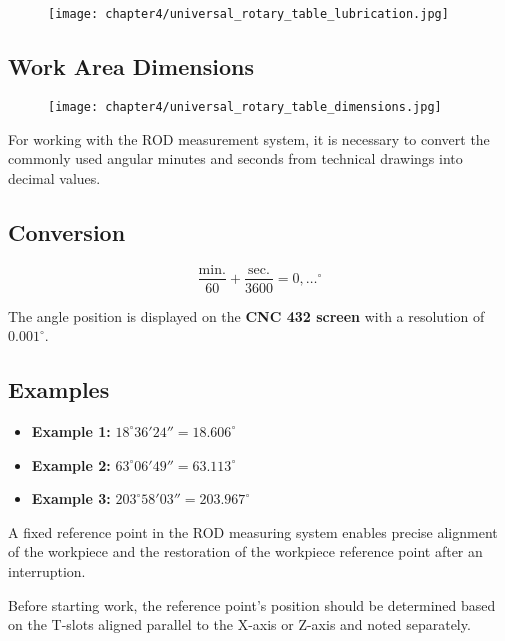 \begin{figure}[h]
    \centering
    \texttt{[image: chapter4/universal\_rotary\_table\_lubrication.jpg]}
\end{figure}

\newpage
\subsection{Work Area Dimensions}

\begin{figure}[h]
    \centering
    \texttt{[image: chapter4/universal\_rotary\_table\_dimensions.jpg]}
\end{figure}


For working with the ROD measurement system, it is necessary to convert the commonly used angular minutes and seconds from technical drawings into decimal values.

\subsection*{Conversion}
\[
\frac{\text{min.}}{60} + \frac{\text{sec.}}{3600} = 0,\dots^{\circ}
\]

The angle position is displayed on the \textbf{CNC 432 screen} with a resolution of $0.001^{\circ}$.

\subsection*{Examples}
\begin{itemize}
    \item \textbf{Example 1:} $18^{\circ} 36' 24'' = 18.606^{\circ}$
    \item \textbf{Example 2:} $63^{\circ} 06' 49'' = 63.113^{\circ}$
    \item \textbf{Example 3:} $203^{\circ} 58' 03'' = 203.967^{\circ}$
\end{itemize}

A fixed reference point in the ROD measuring system enables precise alignment of the workpiece and the restoration of the workpiece reference point after an interruption.

Before starting work, the reference point’s position should be determined based on the T-slots aligned parallel to the X-axis or Z-axis and noted separately.\footnotemark

